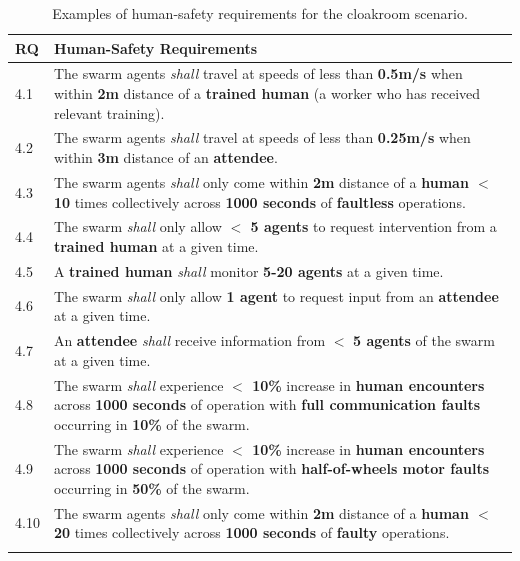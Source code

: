 \documentclass{article}
\begin{document}
\begin{table}[!h]
\centering
\caption{\label{tab:human-s}Examples of human-safety requirements for the cloakroom scenario.}
\begin{tabular}{p{6mm} p{140mm}}
\textbf{RQ} & \textbf{Human-Safety Requirements} \\
\hline
4.1 & The swarm agents \emph{shall} travel at speeds of less than \textbf{0.5m/s} when within \textbf{2m} distance of a \textbf{trained human} (a worker who has received relevant training).
\\ 
\hline
4.2 & The swarm agents \emph{shall} travel at speeds of less than \textbf{0.25m/s} when within \textbf{3m} distance of an \textbf{attendee}.
\\ 
\hline
4.3 & The swarm agents \emph{shall} only come within \textbf{2m} distance of a \textbf{human $<$ 10} times collectively across \textbf{1000 seconds} of \textbf{faultless} operations.
\\ 
\hline
4.4 & The swarm \emph{shall} only allow \textbf{$<$ 5 agents} to request intervention from a \textbf{trained human} at a given time.
\\ 
\hline
4.5 & A \textbf{trained human} \emph{shall} monitor \textbf{5-20 agents} at a given time.
\\ 
\hline
4.6 & The swarm \emph{shall} only allow \textbf{1 agent} to request input from an \textbf{attendee} at a given time.
\\ 
\hline
4.7 & An \textbf{attendee} \emph{shall} receive  information from $<$ \textbf{5 agents} of the swarm at a given time.
\\ 
\hline
4.8 & The swarm \emph{shall} experience \textbf{$<$ 10\%} increase in \textbf{human encounters} across \textbf{1000 seconds} of operation with \textbf{full communication faults} occurring in \textbf{10\%} of the swarm. \\
\hline
4.9 & The swarm \emph{shall} experience \textbf{$<$ 10\%} increase in \textbf{human encounters }across \textbf{1000 seconds} of operation with \textbf{half-of-wheels motor faults} occurring in \textbf{50\%} of the swarm.\\
\hline
4.10 & The swarm agents \emph{shall} only come within \textbf{2m} distance of a \textbf{human $<$ 20} times collectively across \textbf{1000 seconds} of \textbf{faulty} operations.
\\				
\hline \\[-1\medskipamount]
\end{tabular}
\end{table}   
\end{document}
